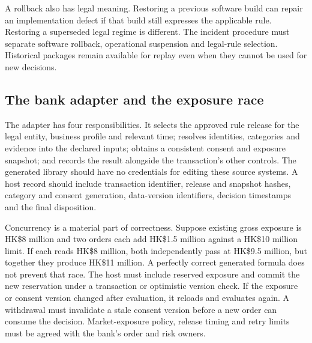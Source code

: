 A rollback also has legal meaning. Restoring a previous software build can repair
an implementation defect if that build still expresses the applicable rule.
Restoring a superseded legal regime is different. The incident procedure must
separate software rollback, operational suspension and legal-rule selection.
Historical packages remain available for replay even when they cannot be used for
new decisions.

\subsection{The bank adapter and the exposure race}
\label{merge:P-03d-java-delivery:05}


The adapter has four responsibilities. It selects the approved rule release for
the legal entity, business profile and relevant time; resolves identities,
categories and evidence into the declared inputs; obtains a consistent consent
and exposure snapshot; and records the result alongside the transaction's other
controls. The generated library should have no credentials for editing these
source systems. A host record should include transaction identifier, release and
snapshot hashes, category and consent generation, data-version identifiers,
decision timestamps and the final disposition.

Concurrency is a material part of correctness. Suppose existing gross exposure
is HK\$8 million and two orders each add HK\$1.5 million against a HK\$10 million
limit. If each reads HK\$8 million, both independently pass at HK\$9.5 million,
but together they produce HK\$11 million. A perfectly correct generated formula
does not prevent that race. The host must include reserved exposure and commit
the new reservation under a transaction or optimistic version check. If the
exposure or consent version changed after evaluation, it reloads and evaluates
again. A withdrawal must invalidate a stale consent version before a new order
can consume the decision. Market-exposure policy, release timing and retry limits
must be agreed with the bank's order and risk owners.

